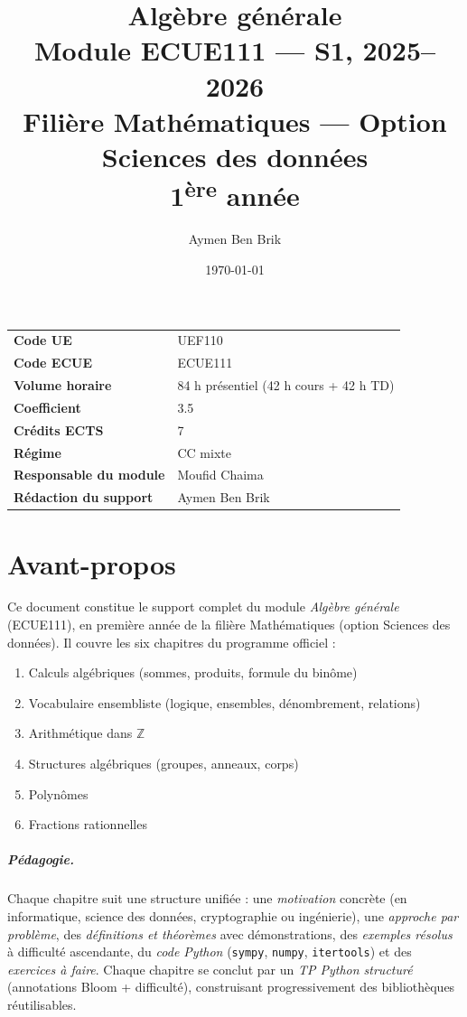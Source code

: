 \documentclass[12pt,a4paper,openright]{report}
\title{
    \vspace*{2cm}
    {\Huge \textbf{Algèbre générale}} \\[0.5cm]
    {\Large Module ECUE111 --- S1, 2025--2026} \\[1cm]
    {\large Filière Mathématiques --- Option Sciences des données} \\[0.3cm]
    {\large 1\textsuperscript{ère} année}
}
\author{Aymen Ben Brik}
\date{\today}
\theoremstyle{definition}
\theoremstyle{remark}
\begin{document}
\begin{titlepage}
\maketitle
\vfill
\begin{center}
\begin{tabular}{ll}
\textbf{Code UE} & UEF110 \\
\textbf{Code ECUE} & ECUE111 \\
\textbf{Volume horaire} & 84 h présentiel (42 h cours + 42 h TD) \\
\textbf{Coefficient} & 3.5 \\
\textbf{Crédits ECTS} & 7 \\
\textbf{Régime} & CC mixte \\
\textbf{Responsable du module} & Moufid Chaima \\
\textbf{Rédaction du support} & Aymen Ben Brik \\
\end{tabular}
\end{center}
\vfill
\end{titlepage}

\chapter*{Avant-propos}

Ce document constitue le support complet du module \emph{Algèbre générale} (ECUE111), en première année de la filière Mathématiques (option Sciences des données). Il couvre les six chapitres du programme officiel :
\begin{enumerate}
    \item Calculs algébriques (sommes, produits, formule du binôme)
    \item Vocabulaire ensembliste (logique, ensembles, dénombrement, relations)
    \item Arithmétique dans $\mathbb{Z}$
    \item Structures algébriques (groupes, anneaux, corps)
    \item Polynômes
    \item Fractions rationnelles
\end{enumerate}

\paragraph{Pédagogie.} Chaque chapitre suit une structure unifiée : une \emph{motivation} concrète (en informatique, science des données, cryptographie ou ingénierie), une \emph{approche par problème}, des \emph{définitions et théorèmes} avec démonstrations, des \emph{exemples résolus} à difficulté ascendante, du \emph{code Python} (\texttt{sympy}, \texttt{numpy}, \texttt{itertools}) et des \emph{exercices à faire}. Chaque chapitre se conclut par un \emph{TP Python structuré} (annotations Bloom + difficulté), construisant progressivement des bibliothèques réutilisables.
\end{document}
